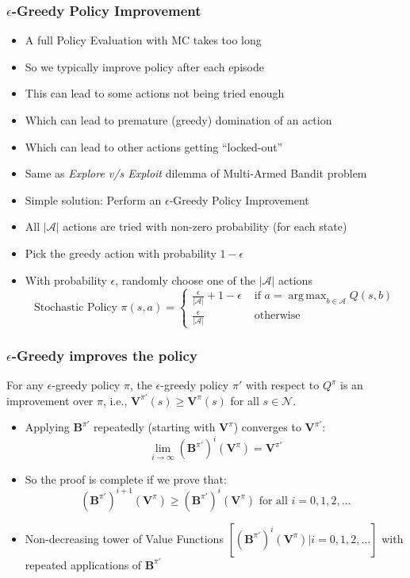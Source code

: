 \documentclass[handout]{beamer}
\DeclareMathOperator*{\argmax}{arg\,max}
\newcommand{\bvpi}{\bm{V}^{\pi}}
\begin{document}
\begin{frame}
\frametitle{$\epsilon$-Greedy Policy Improvement}
\begin{itemize}[<+->]
\item A full Policy Evaluation with MC takes too long
\item So we typically improve policy after each episode
\item This can lead to some actions not being tried enough
\item Which can lead to premature (greedy) domination of an action
\item Which can lead to other actions getting ``locked-out''
\item Same as {\em Explore v/s Exploit} dilemma of Multi-Armed Bandit problem
\item Simple solution: Perform an $\epsilon$-Greedy Policy Improvement
\item All $|\mathcal{A}|$ actions are tried with non-zero probability (for each state)
\item Pick the greedy action with probability $1-\epsilon$
\item With probability $\epsilon$, randomly choose one of the $|\mathcal{A}|$ actions
$$\text{Stochastic Policy } \pi(s,a) = 
\begin{cases}
\frac {\epsilon} {|\mathcal{A}|} + 1 - \epsilon & \text{ if } a = \argmax_{b \in \mathcal{A}} Q(s, b) \\
\frac {\epsilon} {|\mathcal{A}|} & \text{ otherwise}
\end{cases}
$$
\end{itemize}
\end{frame}


\begin{frame}
\frametitle{$\epsilon$-Greedy improves the policy}
\pause
\begin{theorem}
For any $\epsilon$-greedy policy $\pi$, the $\epsilon$-greedy policy $\pi'$ with respect to $Q^{\pi}$ is an improvement over $\pi$, i.e., $\bm{V}^{\pi'}(s) \geq \bm{V}^{\pi}(s)$ for all $s \in \mathcal{N}$.
\end{theorem}
\pause
\begin{itemize}[<+->]
\item Applying $\bm{B}^{\pi'}$ repeatedly (starting with $\bvpi$) converges to $\bm{V}^{\pi'}$:
$$\lim_{i\rightarrow \infty} (\bm{B}^{\pi'})^i(\bvpi) = \bm{V}^{\pi'}$$
\item So the proof is complete if we prove that:
$$(\bm{B}^{\pi'})^{i+1}(\bvpi) \geq (\bm{B}^{\pi'})^i(\bvpi) \text{ for all } i = 0, 1, 2, \ldots$$
\item Non-decreasing tower of Value Functions $[(\bm{B}^{\pi'})^i(\bvpi)|i = 0, 1, 2, \ldots]$ with repeated applications of $\bm{B}^{\pi'}$
\end{itemize}
\end{frame}
\end{document}
